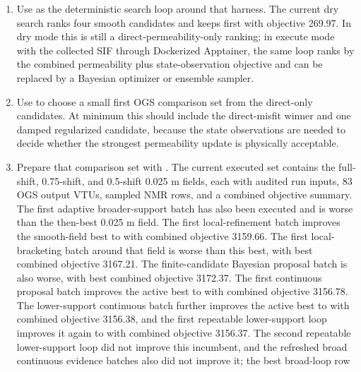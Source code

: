 \begin{enumerate}[leftmargin=1.5em]
  verified runs on the current direct-fit and smooth-search meshes prepare run
  copies, audit run-input mesh fields and submeshes, evaluate direct permeability,
  execute or record the OGS command, sample available state outputs, audit the RH
  boundary curve, evaluate state targets, and write the combined objective summary.
  \item Use  as the deterministic search loop
  around that harness.  The current dry search ranks four smooth candidates and keeps
   first with objective 269.97.  In dry mode this is still a
  direct-permeability-only ranking; in execute mode with the collected SIF through
  Dockerized Apptainer, the same loop ranks by the combined permeability plus
  state-observation objective and can be replaced by a Bayesian optimizer or ensemble
  sampler.
  \item Use  to choose a small
  first OGS comparison set from the direct-only candidates.  At minimum this should
  include the direct-misfit winner and one damped regularized candidate, because the
  state observations are needed to decide whether the strongest permeability update
  is physically acceptable.
  \item Prepare that comparison set with
  .  The current executed set contains the
  full-shift, 0.75-shift, and 0.5-shift 0.025 m fields, each with audited run inputs,
  83 OGS output VTUs, sampled NMR rows, and a combined objective summary.  The first
  adaptive broader-support batch has also been executed and is worse than the
  then-best 0.025 m field.  The first local-refinement batch improves the smooth-field best to
   with combined objective 3159.66.  The first local-bracketing
  batch around that field is worse than this best, with best combined objective
  3167.21.  The finite-candidate Bayesian proposal batch is also worse, with best
  combined objective 3172.37.  The first continuous proposal batch improves the
  active best to  with combined objective 3156.78.
  The lower-support continuous batch further improves the active best to
   with combined objective 3156.38, and the first
  repeatable lower-support loop improves it again to
   with combined objective 3156.37.  The second
  repeatable lower-support loop did not improve this incumbent, and the refreshed
  broad continuous evidence batches also did not improve it; the best broad-loop row

\end{enumerate}
